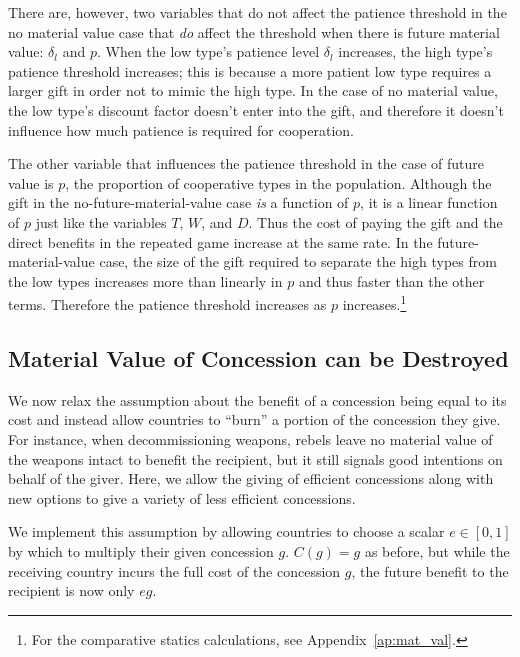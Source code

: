 \documentclass[12pt, letterpaper]{article}
\newcommand{\de}{\delta}
\begin{document}
There are, however, two variables that do not affect the patience threshold in the no material value case that \textit{do} affect the threshold when there is future material value: $\de_l$ and $p$. When the low type's patience level $\de_l$ increases, the high type's patience threshold increases; this is because a more patient low type requires a larger gift in order not to mimic the high type. In the case of no material value, the low type's discount factor doesn't enter into the gift, and therefore it doesn't influence how much patience is required for cooperation.

The other variable that influences the patience threshold in the case of future value is $p$, the proportion of cooperative types in the population. Although the gift in the no-future-material-value case \emph{is} a function of $p$, it is a linear function of $p$ just like the variables $T$, $W$, and $D$. Thus the cost of paying the gift and the direct benefits in the repeated game increase at the same rate. In the future-material-value case, the size of the gift required to separate the high types from the low types increases more than linearly in $p$ and thus faster than the other terms. Therefore the patience threshold increases as $p$ increases.\footnote{For the comparative statics calculations, see Appendix~\ref{ap:mat_val}.} 


\subsection{Material Value of Concession can be Destroyed}
\label{sec:matval}
We now relax the assumption about the benefit of a concession being equal to its cost and instead allow countries to ``burn'' a portion of the concession they give. For instance, when decommissioning weapons, rebels leave no material value of the weapons intact to benefit the recipient, but it still signals good intentions on behalf of the giver. Here, we allow the giving of efficient concessions along with new options to give a variety of less efficient concessions. 

We implement this assumption by allowing countries to choose a scalar $e \in[0,1]$ by which to multiply their given concession $g$. $C(g)= g$ as before, but while the receiving country incurs the full cost of the concession $g$, the future benefit to the recipient is now only $eg$.
\end{document}
